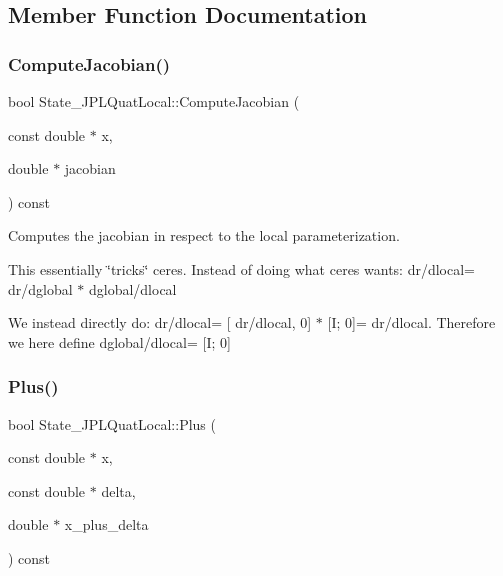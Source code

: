 \subsection{Member Function Documentation}
\mbox{\label{classov__init_1_1State__JPLQuatLocal_ab6732d5027ddfa89a76d00ef35ee2fc8}} 
\subsubsection{\texorpdfstring{Compute\+Jacobian()}{ComputeJacobian()}}
{\footnotesize\ttfamily bool State\+\_\+\+J\+P\+L\+Quat\+Local\+::\+Compute\+Jacobian (\begin{DoxyParamCaption}\item[{const double $\ast$}]{x,  }\item[{double $\ast$}]{jacobian }\end{DoxyParamCaption}) const\hspace{0.3cm}{\ttfamily [override]}}



Computes the jacobian in respect to the local parameterization. 

This essentially \char`\"{}tricks\char`\"{} ceres. Instead of doing what ceres wants\+: dr/dlocal= dr/dglobal $\ast$ dglobal/dlocal

We instead directly do\+: dr/dlocal= \mbox{[} dr/dlocal, 0\mbox{]} $\ast$ \mbox{[}I; 0\mbox{]}= dr/dlocal. Therefore we here define dglobal/dlocal= \mbox{[}I; 0\mbox{]} \mbox{\label{classov__init_1_1State__JPLQuatLocal_ae0d6f02fa9043878a623bc46aee0c928}} 
\subsubsection{\texorpdfstring{Plus()}{Plus()}}
{\footnotesize\ttfamily bool State\+\_\+\+J\+P\+L\+Quat\+Local\+::\+Plus (\begin{DoxyParamCaption}\item[{const double $\ast$}]{x,  }\item[{const double $\ast$}]{delta,  }\item[{double $\ast$}]{x\+\_\+plus\+\_\+delta }\end{DoxyParamCaption}) const\hspace{0.3cm}{\ttfamily [override]}}



